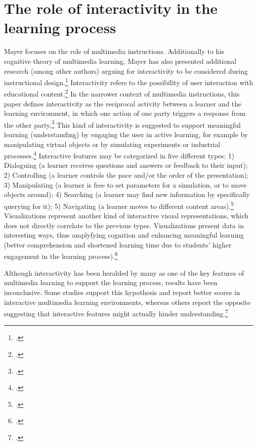 \section{The role of interactivity in the learning process} \label{sec:Interactivity}
Mayer focuses on the role of multimedia instructions. Additionally to his cognitive theory of multimedia learning, Mayer has also presented additional research (among other authors) arguing for interactivity to be considered during instructional design.\footcites[Cf.][chapter 2, paragraph 12]{ClarkElearningscienceinstruction2016} Interactivity refers to the possibility of user interaction with educational content.\footcites[Cf.][p.292]{PatwardhanWhendoeshigher2015} In the narrower context of multimedia instructions, this paper defines interactivity as the reciprocal activity between a learner and the learning environment, in which one action of one party triggers a response from the other party.\footcites[Cf.][p.1025]{DomagkInteractivitymultimedialearning2010} This kind of interactivity is suggested to support meaningful learning (understanding) by engaging the user in active learning, for example by manipulating virtual objects or by simulating experiments or industrial processes.\footcites[Cf.][p.161]{CairncrossInteractiveMultimediaLearning2001}[cf.][p.1159]{Evansinteractivityeffectmultimedia2007} Interactive features may be categorized in five different types: 1) Dialoguing (a learner receives questions and answers or feedback to their input); 2) Controlling (a learner controls the pace and/or the order of the presentation); 3) Manipulating (a learner is free to set parameters for a simulation, or to move objects around); 4) Searching (a learner may find new information by specifically querying for it); 5) Navigating (a learner moves to different content areas).\footcites[Cf.][p.311]{MorenoInteractiveMultimodalLearning2007} Visualizations represent another kind of interactive visual representations, which does not directly correlate to the previous types. Visualizations present data in interesting ways, thus amplyfying cognition and enhancing meaningful learning (better comprehension and shortened learning time due to students' higher engagement in the learning process).\footcites[Cf.][p.294]{PatwardhanWhendoeshigher2015} 

Although interactivity has been heralded by many as one of the key features of multimedia learning to support the learning process, results have been inconclusive. Some studies support this hypothesis and report better scores in interactive multimedia learning environments, whereas others report the opposite suggesting that interactive features might actually hinder understanding.\footcites[Cf.][p.1024]{DomagkInteractivitymultimedialearning2010}[cf.][]{MayerWhenLearningJust2001}[cf.][p.156]{CairncrossInteractiveMultimediaLearning2001}[cf.][pp. 1148 et seq]{Evansinteractivityeffectmultimedia2007}[cf.][p.48]{SordenCognitiveTheoryMultimedia2012}

